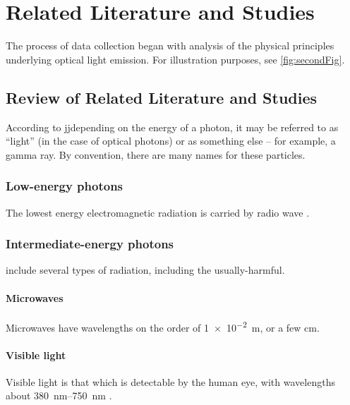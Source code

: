
\chapter{Related Literature and Studies}
\begin{refsection}

The process of data collection began with analysis of the physical principles underlying optical light emission. For illustration purposes, see \ref{fig:secondFig}.

\section{Review of Related Literature and Studies}


According to  jjdepending on the energy of a photon, it may be referred to as ``light'' (in the case of optical photons) or as something else -- for example, a gamma ray. By convention, there are many names for these particles.

\subsection{Low-energy photons}

The lowest energy electromagnetic radiation is carried by radio wave \cite{allen2019fast}.

\subsection{Intermediate-energy photons}

 include several types of radiation, including the usually-harmful.

\subsubsection{Microwaves}

Microwaves have wavelengths on the order of \SI{1e-2}{\meter}, or a few \si{\centi\meter}.

\subsubsection{Visible light}

Visible light is that which is detectable by the human eye, with wavelengths about \SIrange{380}{750}{\nano\meter} \cite{onate_exploring_2021, wannier1987statistical}.


\end{refsection}
